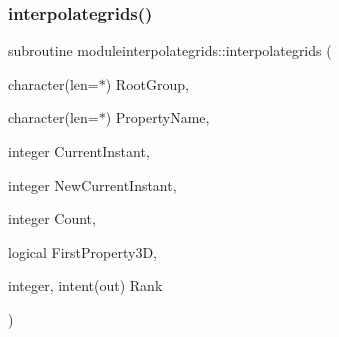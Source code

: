 \subsubsection{\texorpdfstring{interpolategrids()}{interpolategrids()}}
{\footnotesize\ttfamily subroutine moduleinterpolategrids\+::interpolategrids (\begin{DoxyParamCaption}\item[{character(len=$\ast$)}]{Root\+Group,  }\item[{character(len=$\ast$)}]{Property\+Name,  }\item[{integer}]{Current\+Instant,  }\item[{integer}]{New\+Current\+Instant,  }\item[{integer}]{Count,  }\item[{logical}]{First\+Property3D,  }\item[{integer, intent(out)}]{Rank }\end{DoxyParamCaption})\hspace{0.3cm}{\ttfamily [private]}}

